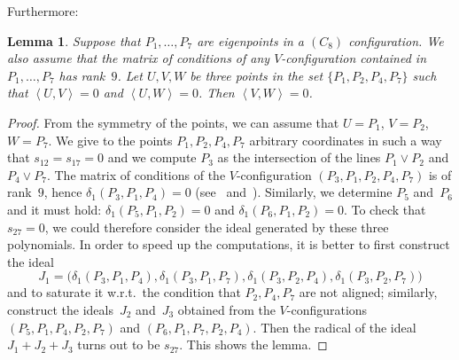 \documentclass[a4paper, 11pt, reqno]{amsart}
\theoremstyle{plain}
\newtheorem{lemma}{Lemma}[section]
\theoremstyle{definition}
\newcommand{\scl}[2]{\left\langle {#1}, {#2} \right\rangle}
\begin{document}
Furthermore:

\begin{lemma}
\label{lemma:three_s_zero}
Suppose that $P_1, \dotsc, P_7$ are eigenpoints in a $(C_8)$ configuration.
We also assume that the matrix of conditions of any $V$-configuration contained in $P_1, \dotsc, P_7$ has rank~$9$. 
Let $U, V, W$ be three points in the set $\{P_1, P_2, P_4, P_7\}$
such that $\scl{U}{V} = 0$ and $\scl{U}{W} = 0$.
Then $\scl{V}{W} = 0$.
\end{lemma}
\begin{proof}
From the symmetry of the points, we can assume that $U=P_1$, $V=P_2$, 
$W=P_7$.
We give to the points $P_1, P_2, P_4, P_7$ arbitrary coordinates 
in such a way that $s_{12}= s_{17}=0$ and 
we compute $P_3$ as the intersection of the lines $P_1 \vee P_2$ and 
$P_4 \vee P_7$. The matrix of conditions of the $V$-configuration 
$(P_3, P_1, P_2, P_4, P_7)$ 
is of rank~$9$, hence $\delta_1(P_3, P_1, P_4) = 0$ 
(see~ and~). 
Similarly, we determine $P_5$ and~$P_6$ and it must hold:
$\delta_1(P_5, P_1, P_2) = 0$ and $\delta_1(P_6, P_1, P_2) = 0$. To 
check  that $s_{27} = 0$, we could 
therefore consider the ideal generated by these three polynomials. 
In order to speed up the computations, it is better to first construct
the ideal
%
\[
  J_1 = 
  \bigl(
    \delta_1(P_3, P_1, P_4), \delta_1(P_3, P_1, P_7),
    \delta_1(P_3, P_2, P_4), \delta_1(P_3, P_2, P_7)
  \bigr)
\]
%
and to saturate it w.r.t.\ the condition that $P_2, P_4, P_7$ are not 
aligned; similarly, construct the ideals~$J_2$ and~$J_3$ obtained 
from the $V$-configurations $(P_5, P_1, P_4, P_2, P_7)$ and 
$(P_6, P_1, P_7, P_2, P_4)$. Then the radical of the ideal $J_1+J_2+J_3$
turns out to be $s_{27}$. This shows the lemma.
\end{proof}
\end{document}
